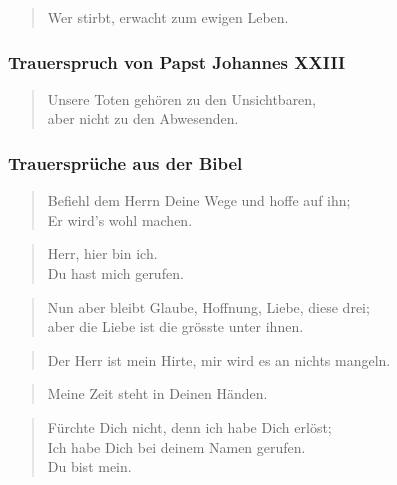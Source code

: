 \documentclass[ngerman,a4paper,11pt]{scrreprt}
\begin{document}
\begin{verse}
Wer stirbt, erwacht zum ewigen Leben. \\
\end{verse}

\subsubsection*{Trauerspruch von Papst Johannes XXIII}
\label{sec-1-1-1-2-4}

\begin{verse}
Unsere Toten gehören zu den Unsichtbaren, \\
aber nicht zu den Abwesenden. \\
\end{verse}

\subsubsection*{Trauersprüche aus der Bibel}
\label{sec-1-1-1-2-5}

\begin{verse}
Befiehl dem Herrn Deine Wege und hoffe auf ihn; \\
Er wird's wohl machen. \\
\end{verse}

\begin{verse}
Herr, hier bin ich. \\
Du hast mich gerufen. \\
\end{verse}

\begin{verse}
Nun aber bleibt Glaube, Hoffnung, Liebe, diese drei; \\
aber die Liebe ist die grösste unter ihnen. \\
\end{verse}

\begin{verse}
Der Herr ist mein Hirte, mir wird es an nichts mangeln. \\
\end{verse}

\begin{verse}
Meine Zeit steht in Deinen Händen. \\
\end{verse}

\begin{verse}
Fürchte Dich nicht, denn ich habe Dich erlöst; \\
Ich habe Dich bei deinem Namen gerufen. \\
Du bist mein. \\
\end{verse}
\end{document}
